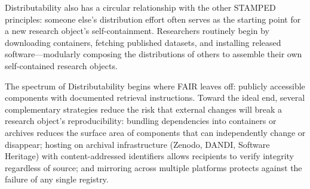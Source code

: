 \documentclass{article}
\begin{document}
Distributability also has a circular relationship with the other STAMPED principles: someone else's distribution effort often serves as the starting point for a new research object's self-containment.
Researchers routinely begin by downloading containers, fetching published datasets, and installing released software---modularly composing the distributions of others to assemble their own self-contained research objects.

The spectrum of Distributability begins where FAIR leaves off: publicly accessible components with documented retrieval instructions.
Toward the ideal end, several complementary strategies reduce the risk that external changes will break a research object's reproducibility: bundling dependencies into containers or archives reduces the surface area of components that can independently change or disappear; hosting on archival infrastructure (Zenodo, DANDI, Software Heritage) with content-addressed identifiers allows recipients to verify integrity regardless of source; and mirroring across multiple platforms protects against the failure of any single registry.
\end{document}

